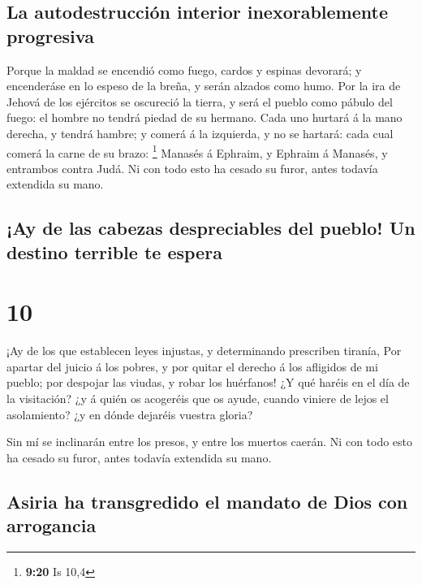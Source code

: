\hypertarget{la-autodestrucciuxf3n-interior-inexorablemente-progresiva}{%
\subsection{La autodestrucción interior inexorablemente
progresiva}\label{la-autodestrucciuxf3n-interior-inexorablemente-progresiva}}

 Porque la maldad se encendió como fuego, cardos y
espinas devorará; y encenderáse en lo espeso de la breña, y serán
alzados como humo.  Por la ira de Jehová de los ejércitos
se oscureció la tierra, y será el pueblo como pábulo del fuego: el
hombre no tendrá piedad de su hermano.  Cada uno hurtará
á la mano derecha, y tendrá hambre; y comerá á la izquierda, y no se
hartará: cada cual comerá la carne de su brazo: \footnote{\textbf{9:20}
  Is 10,4}  Manasés á Ephraim, y Ephraim á Manasés, y
entrambos contra Judá. Ni con todo esto ha cesado su furor, antes
todavía extendida su mano.

\hypertarget{ay-de-las-cabezas-despreciables-del-pueblo-un-destino-terrible-te-espera}{%
\subsection{¡Ay de las cabezas despreciables del pueblo! Un destino
terrible te
espera}\label{ay-de-las-cabezas-despreciables-del-pueblo-un-destino-terrible-te-espera}}

\hypertarget{section-9}{%
\section{10}\label{section-9}}

 ¡Ay de los que establecen leyes injustas, y determinando
prescriben tiranía,  Por apartar del juicio á los pobres,
y por quitar el derecho á los afligidos de mi pueblo; por despojar las
viudas, y robar los huérfanos!  ¿Y qué haréis en el día de
la visitación? ¿y á quién os acogeréis que os ayude, cuando viniere de
lejos el asolamiento? ¿y en dónde dejaréis vuestra gloria?

 Sin mí se inclinarán entre los presos, y entre los
muertos caerán. Ni con todo esto ha cesado su furor, antes todavía
extendida su mano.

\hypertarget{asiria-ha-transgredido-el-mandato-de-dios-con-arrogancia}{%
\subsection{Asiria ha transgredido el mandato de Dios con
arrogancia}\label{asiria-ha-transgredido-el-mandato-de-dios-con-arrogancia}}

